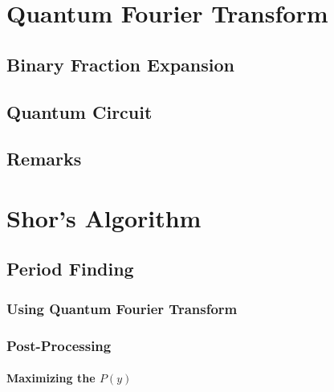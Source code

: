     \section{Quantum Fourier Transform} %

        \subsection{Binary Fraction Expansion} %

        \subsection{Quantum Circuit} %

        \subsection{Remarks} %

    \section{Shor's Algorithm} %

        \subsection{Period Finding} %

            \subsubsection{Using Quantum Fourier Transform} %

            \subsubsection{Post-Processing} %

                \paragraph{Maximizing the \(P(y)\)} %

